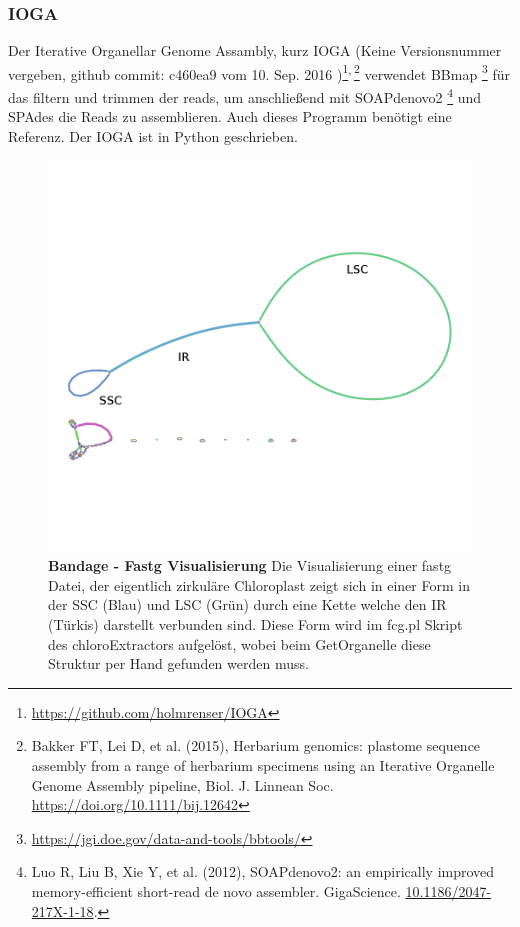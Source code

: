 \documentclass{scrartcl}
\begin{document}
\subsubsection{IOGA}
\label{sec-2-5-6}
Der Iterative Organellar Genome Assambly, kurz IOGA (Keine Versionsnummer vergeben, github commit: c460ea9 vom 10. Sep. 2016 )\footnote{\url{https://github.com/holmrenser/IOGA}}\textsuperscript{,}\,\footnote{Bakker FT, Lei D, et al. (2015), Herbarium genomics: plastome sequence assembly from a range of herbarium specimens using an Iterative Organelle Genome Assembly pipeline, Biol. J. Linnean Soc. \url{https://doi.org/10.1111/bij.12642}} verwendet BBmap \footnote{\url{https://jgi.doe.gov/data-and-tools/bbtools/}} für das filtern und trimmen der reads, um anschließend mit 
SOAPdenovo2 \footnote{Luo R, Liu B, Xie Y, et al. (2012), SOAPdenovo2: an empirically improved memory-efficient short-read de novo assembler. GigaScience.  \url{10.1186/2047-217X-1-18}.} und SPAdes \footnotemark[21]{} die Reads zu assemblieren. 
Auch dieses Programm benötigt eine Referenz. Der IOGA ist in Python geschrieben.
\begin{figure}
\includegraphics[width=.9\linewidth]{./graphCE_SRR1945473_1.png}
\caption[Bandage - Fastg Visualisierung]{\textbf{Bandage - Fastg Visualisierung} Die Visualisierung einer fastg Datei, der eigentlich zirkuläre Chloroplast zeigt sich in einer Form in der SSC (Blau) und LSC (Grün) durch eine Kette welche den IR (Türkis) darstellt verbunden sind. Diese Form wird im fcg.pl Skript des chloroExtractors aufgelöst, wobei beim GetOrganelle diese Struktur per Hand gefunden werden muss.}
\end{figure}
\end{document}
